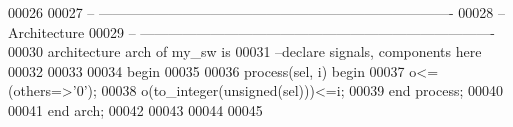 \begin{DoxyCode}
00026 
00027 \textcolor{keyword}{-- ----------------------------------------------------------------------------}
00028 \textcolor{keyword}{-- Architecture}
00029 \textcolor{keyword}{-- ----------------------------------------------------------------------------}
00030 \textcolor{keywordflow}{architecture} arch \textcolor{keywordflow}{of} my_sw is
00031 \textcolor{keyword}{--declare signals,  components here}
00032 
00033   
00034 \textcolor{vhdlkeyword}{begin}
00035 
00036 \textcolor{keywordflow}{process}(sel, i) \textcolor{keywordflow}{begin}
00037     \textcolor{vhdlchar}{o}\textcolor{vhdlchar}{<=}\textcolor{vhdlchar}{(}\textcolor{keywordflow}{others}\textcolor{vhdlchar}{=}\textcolor{vhdlchar}{>}\textcolor{vhdlchar}{'}\textcolor{vhdllogic}{}\textcolor{vhdllogic}{0}\textcolor{vhdlchar}{'}\textcolor{vhdlchar}{)};
00038     \textcolor{vhdlchar}{o}\textcolor{vhdlchar}{(}\textcolor{vhdlchar}{to\_integer}\textcolor{vhdlchar}{(}\textcolor{comment}{unsigned}\textcolor{vhdlchar}{(}\textcolor{vhdlchar}{sel}\textcolor{vhdlchar}{)}\textcolor{vhdlchar}{)}\textcolor{vhdlchar}{)}\textcolor{vhdlchar}{<=}\textcolor{vhdlchar}{i};
00039 \textcolor{keywordflow}{end} \textcolor{keywordflow}{process};
00040   
00041 \textcolor{keywordflow}{end} \textcolor{vhdlchar}{arch};
00042 
00043 
00044 
00045 
\end{DoxyCode}
